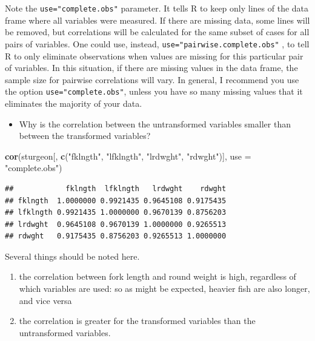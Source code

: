 \documentclass[
  12pt,
]{book}
\newenvironment{Shaded}{\begin{snugshade}}{\end{snugshade}}
\newcommand{\DataTypeTok}[1]{\textcolor[rgb]{0.13,0.29,0.53}{#1}}
\newcommand{\KeywordTok}[1]{\textcolor[rgb]{0.13,0.29,0.53}{\textbf{#1}}}
\newcommand{\NormalTok}[1]{#1}
\newcommand{\StringTok}[1]{\textcolor[rgb]{0.31,0.60,0.02}{#1}}
\providecommand{\tightlist}{%
  \setlength{\itemsep}{0pt}\setlength{\parskip}{0pt}}
\begin{document}
Note the \texttt{use="complete.obs"} parameter. It tells R to keep only lines of the data frame where all variables were measured. If there are missing data, some lines will be removed, but correlations will be calculated for the same subset of cases for all pairs of variables. One could use, instead, \texttt{use="pairwise.complete.obs"} , to tell R to only eliminate observations when values are missing for this particular pair of variables. In this situation, if there are missing values in the data frame, the sample size for pairwise correlations will vary. In general, I recommend you use the option \texttt{use="complete.obs"}, unless you have so many missing values that it eliminates the majority of your data.

\begin{itemize}
\tightlist
\item
  Why is the correlation between the untransformed variables smaller than between the transformed variables?
\end{itemize}

\begin{Shaded}
\begin{Highlighting}[]
\KeywordTok{cor}\NormalTok{(sturgeon[, }\KeywordTok{c}\NormalTok{(}\StringTok{"fklngth"}\NormalTok{, }\StringTok{"lfklngth"}\NormalTok{, }\StringTok{"lrdwght"}\NormalTok{, }\StringTok{"rdwght"}\NormalTok{)], }\DataTypeTok{use =} \StringTok{"complete.obs"}\NormalTok{)}
\end{Highlighting}
\end{Shaded}

\begin{verbatim}
##            fklngth  lfklngth   lrdwght    rdwght
## fklngth  1.0000000 0.9921435 0.9645108 0.9175435
## lfklngth 0.9921435 1.0000000 0.9670139 0.8756203
## lrdwght  0.9645108 0.9670139 1.0000000 0.9265513
## rdwght   0.9175435 0.8756203 0.9265513 1.0000000
\end{verbatim}

Several things should be noted here.

\begin{enumerate}
\def\labelenumi{\arabic{enumi}.}
\tightlist
\item
  the correlation between fork length and round weight is high, regardless of which variables are used: so as might be expected, heavier fish are also longer, and vice versa
\item
  the correlation is greater for the transformed variables than the untransformed variables.
\end{enumerate}
\end{document}
